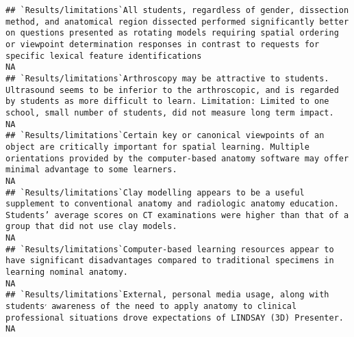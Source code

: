 \documentclass[]{article}
\begin{document}
\begin{verbatim}
## `Results/limitations`All students, regardless of gender, dissection method, and anatomical region dissected performed significantly better on questions presented as rotating models requiring spatial ordering or viewpoint determination responses in contrast to requests for specific lexical feature identifications                                                                                                                                                            NA
## `Results/limitations`Arthroscopy may be attractive to students. Ultrasound seems to be inferior to the arthroscopic, and is regarded by students as more difficult to learn. Limitation: Limited to one school, small number of students, did not measure long term impact.                                                                                                                                                                                                          NA
## `Results/limitations`Certain key or canonical viewpoints of an object are critically important for spatial learning. Multiple orientations provided by the computer-based anatomy software may offer minimal advantage to some learners.                                                                                                                                                                                                                                             NA
## `Results/limitations`Clay modelling appears to be a useful supplement to conventional anatomy and radiologic anatomy education. Students’ average scores on CT examinations were higher than that of a group that did not use clay models.                                                                                                                                                                                                                                           NA
## `Results/limitations`Computer-based learning resources appear to have significant disadvantages compared to traditional specimens in learning nominal anatomy.                                                                                                                                                                                                                                                                                                                       NA
## `Results/limitations`External, personal media usage, along with students׳ awareness of the need to apply anatomy to clinical professional situations drove expectations of LINDSAY (3D) Presenter.                                                                                                                                                                                                                                                                                   NA

\end{verbatim}
\end{document}
